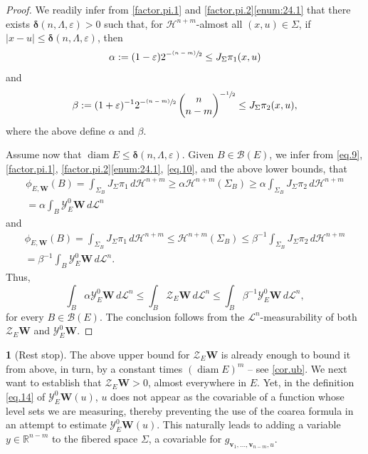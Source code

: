 \documentclass[11pt]{article}
\newcounter{cdrthm}[section]
\theoremstyle{definition}
\theoremstyle{jepanonymous}
\newtheorem{jepempty}[cdrthm]{}
\newenvironment{enonce}[2][remark]{\begin{jepempty}[#2]}{\end{jepempty}}
\theoremstyle{plain}
\newcommand{\psfrac}[2]{\sfrac{(#1)}{#2}}
\newenvironment{Empty}[2][\null]{%
\begin{enonce}[remark]{#1}#2}
{\end{enonce}}
\newcommand{\R}{\mathbb{R}}
\newcommand{\calB}{\mathscr{B}}
\newcommand{\calH}{\mathscr{H}}
\newcommand{\calL}{\mathscr{L}}
\newcommand{\calY}{\mathscr{Y}}
\newcommand{\calZ}{\mathscr{Z}}
\newcommand{\bdelta}{\boldsymbol{\delta}}
\newcommand{\bW}{{\boldsymbol{W}}}
\newcommand{\bv}{{\boldsymbol{v}}}
\DeclareMathOperator{\rmdiam}{\mathrm{diam}}
\newcommand{\bin}[2]{
\begin{pmatrix} #1 \\
#2
\end{pmatrix}}
\let\veps\varepsilon
\begin{document}
\begin{proof}
We readily infer from \ref{factor.pi.1} and \ref{factor.pi.2}\eqref{enum:24.1} that there exists $\bdelta(n,\Lambda,\veps) > 0$ such that, for $\calH^{n+m}$-almost all $(x,u) \in \Sigma$, if $|x-u| \leq \bdelta(n,\Lambda,\veps)$, then
\begin{equation}
\alpha:= (1-\veps) 2^{-\psfrac{n-m}{2}} \leq J_\Sigma \pi_1(x,u)
\end{equation}
and\vspace*{-5pt}
\begin{equation}
\beta:= (1+\veps)^{-1} 2^{-\psfrac{n-m}{2}} \bin{n}{n-m}^{-\sfrac{1}{2}} \leq J_\Sigma \pi_2(x,u),
\end{equation}
where the above define $\alpha$ and $\beta$.
\par
Assume now that $\rmdiam E \leq \bdelta(n,\Lambda,\veps)$.
Given $B \in \calB(E)$, we infer from \eqref{eq.9}, \ref{factor.pi.1}, \ref{factor.pi.2}\eqref{enum:24.1}, \eqref{eq.10}, and the above lower bounds, that\vspace*{-5pt}
\begin{multline*}
\phi_{E,\bW}(B) = \int_{\Sigma_B} J_\Sigma \pi_1 \,d\calH^{n+m}
\geq \alpha \calH^{n+m}(\Sigma_B)
\geq \alpha \int_{\Sigma_B} J_\Sigma \pi_2 \,d\calH^{n+m} \\[-8pt]
= \alpha \int_B \calY^0_E \bW \,d\calL^n
\end{multline*}
and\vspace*{-5pt}
\begin{multline*}
\phi_{E,\bW}(B) = \int_{\Sigma_B} J_\Sigma \pi_1 \,d\calH^{n+m} \leq \calH^{n+m}(\Sigma_B) \leq \beta^{-1} \int_{\Sigma_B} J_\Sigma \pi_2 \,d\calH^{n+m} \\[-8pt]
= \beta^{-1} \int_B \calY^0_E \bW \,d\calL^n.
\end{multline*}
Thus,\vspace*{-3pt}
\begin{equation*}
\int_B \alpha\calY^0_E \bW \,d\calL^n \leq \int_B \calZ_E \bW \,d\calL^n \leq \int_B \beta^{-1} \calY^0_E \bW \,d\calL^n,
\end{equation*}
for every $B \in \calB(E)$.
The conclusion follows from the $\calL^n$-measurability of both $\calZ_E \bW$ and $\calY^0_E \bW$.
\end{proof}

\begin{Empty}[Rest stop]
The above upper bound for $\calZ_E \bW$ is already enough to bound it from above, in turn, by a constant times $(\rmdiam E)^m$ -- see \ref{cor.ub}.
We next want to establish that $\calZ_E \bW > 0$, almost everywhere in $E$.
Yet, in the definition \eqref{eq.14} of $\calY^0_E \bW(u)$, $u$ does not appear as the covariable of a function whose level sets we are measuring, thereby preventing the use of the coarea formula in an attempt to estimate $\calY^0_E \bW(u)$.
This naturally leads to adding a variable $y \in \R^{n-m}$ to the fibered space $\Sigma$, a covariable for $g_{\bv_1,\ldots,\bv_{n-m},u}$.
\end{Empty}
\end{document}
